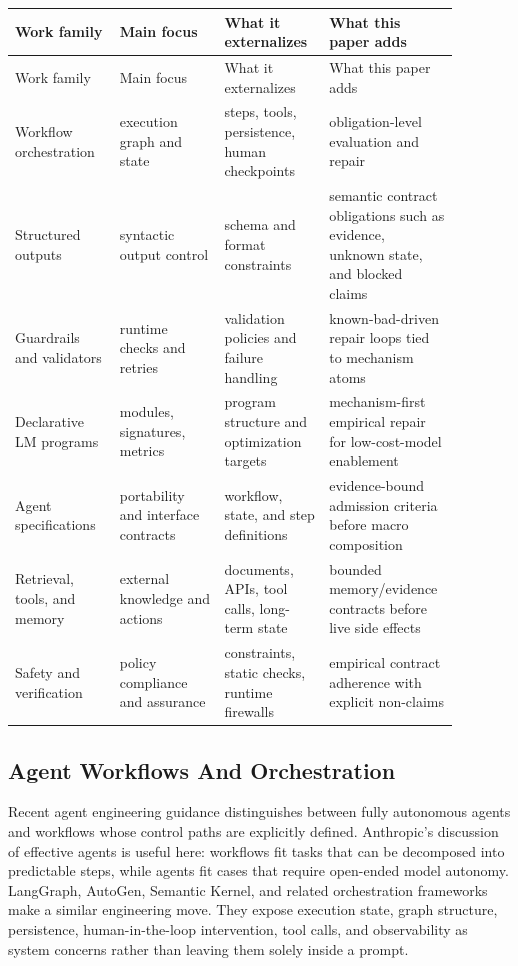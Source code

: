 \documentclass[11pt]{article}
\begin{document}
{\small
\setlength{\tabcolsep}{3pt}
\begin{longtable}{>{\raggedright\arraybackslash}p{0.220\linewidth}>{\raggedright\arraybackslash}p{0.220\linewidth}>{\raggedright\arraybackslash}p{0.220\linewidth}>{\raggedright\arraybackslash}p{0.220\linewidth}}
\toprule
Work family & Main focus & What it externalizes & What this paper adds \\
\midrule
\endfirsthead
\toprule
Work family & Main focus & What it externalizes & What this paper adds \\
\midrule
\endhead
Workflow orchestration & execution graph and state & steps, tools, persistence, human checkpoints & obligation-level evaluation and repair \\
Structured outputs & syntactic output control & schema and format constraints & semantic contract obligations such as evidence, unknown state, and blocked claims \\
Guardrails and validators & runtime checks and retries & validation policies and failure handling & known-bad-driven repair loops tied to mechanism atoms \\
Declarative LM programs & modules, signatures, metrics & program structure and optimization targets & mechanism-first empirical repair for low-cost-model enablement \\
Agent specifications & portability and interface contracts & workflow, state, and step definitions & evidence-bound admission criteria before macro composition \\
Retrieval, tools, and memory & external knowledge and actions & documents, APIs, tool calls, long-term state & bounded memory/evidence contracts before live side effects \\
Safety and verification & policy compliance and assurance & constraints, static checks, runtime firewalls & empirical contract adherence with explicit non-claims \\
\bottomrule
\end{longtable}
}

\subsection{Agent Workflows And Orchestration}

Recent agent engineering guidance distinguishes between fully autonomous agents and workflows whose control paths are explicitly defined. Anthropic's discussion of effective agents is useful here: workflows fit tasks that can be decomposed into predictable steps, while agents fit cases that require open-ended model autonomy. LangGraph, AutoGen, Semantic Kernel, and related orchestration frameworks make a similar engineering move. They expose execution state, graph structure, persistence, human-in-the-loop intervention, tool calls, and observability as system concerns rather than leaving them solely inside a prompt. \cite{P2_EXT_ANTHROPIC,P2_EXT_LANGGRAPH,P2_EXT_AUTOGEN,P2_EXT_SEMANTIC_KERNEL}
\end{document}
